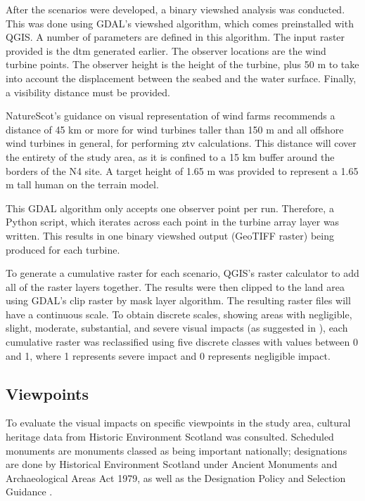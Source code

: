After the scenarios were developed, a binary viewshed analysis was conducted. This was done using GDAL's viewshed algorithm, which comes preinstalled with QGIS. A number of parameters are defined in this algorithm. The input raster provided is the \gls{dtm} generated earlier. The observer locations are the wind turbine points. The observer height is the height of the turbine, plus 50 m to take into account the displacement between the seabed and the water surface. Finally, a visibility distance must be provided.

NatureScot's guidance on visual representation of wind farms \autocite{naturescot-visual} recommends a distance of 45 km or more for wind turbines taller than 150 m and all offshore wind turbines in general, for performing \gls{ztv} calculations. This distance will cover the entirety of the study area, as it is confined to a 15 km buffer around the borders of the N4 site. A target height of 1.65 m was provided to represent a 1.65 m tall human on the terrain model.

This GDAL algorithm only accepts one observer point per run. Therefore, a Python script, which iterates across each point in the turbine array layer was written. This results in one binary viewshed output (GeoTIFF raster) being produced for each turbine.

To generate a cumulative raster for each scenario, QGIS's raster calculator to add all of the raster layers together. The results were then clipped to the land area using GDAL's clip raster by mask layer algorithm. The resulting raster files will have a continuous scale. To obtain discrete scales, showing areas with negligible, slight, moderate, substantial, and severe visual impacts (as suggested in \cite{falconer2013}), each cumulative raster was reclassified using five discrete classes with values between 0 and 1, where 1 represents severe impact and 0 represents negligible impact.

\subsection{Viewpoints}

To evaluate the visual impacts on specific viewpoints in the study area, cultural heritage data from Historic Environment Scotland was consulted. Scheduled monuments are monuments classed as being important nationally; designations are done by Historical Environment Scotland under Ancient Monuments and Archaeological Areas Act 1979, as well as the Designation Policy and Selection Guidance \autocite{hes-scheduling}.

